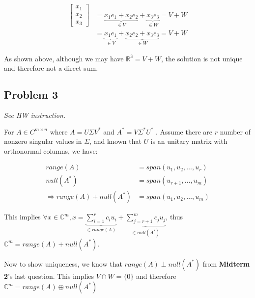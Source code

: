 \documentclass[11pt]{article}
\providecommand{\qbm}[1]{\begin{bmatrix} #1 \end{bmatrix}}
\begin{document}
\begin{align*}
    \qbm{x_1\\ x_2\\ x_3} &= \underbrace{x_1 e_1 + x_2 e_2}_{\in V} + \underbrace{x_3 e_3}_{\in W} = V + W \\
    &= \underbrace{x_1 e_1}_{\in V} + \underbrace{x_2 e_2 + x_3 e_3}_{\in W} = V + W
\end{align*}

As shown above, although we may have $\mathbb{R}^3 = V + W$, the solution is not unique and therefore not a direct sum.


\subsection*{Problem 3}
\textit{See HW instruction.}\newline

For $A \in C^{m \times n}$ where $A = U \Sigma V^*$ and $A^* = V \Sigma^* U^*$ . Assume there are $r$ number of nonzero singular values in $\Sigma$, and known that $U$ is an unitary matrix with orthonormal columns, we have:

\begin{align*}
    range(A) &= span(u_1, u_2, \dots, u_r) \\
    null(A^*) &= span(u_{r+1}, \dots, u_m) \\
    \Longrightarrow range(A) + null(A^*) &= span(u_1, u_2, \dots, u_m)
\end{align*}

This implies $\forall x \in \mathbb{C}^m, x = \underbrace{\sum\limits_{i=1}^r c_i u_i}_{\in range(A)} + \underbrace{\sum\limits_{j = r+1}^m  c_j u_j}_{\in null(A^*)}$, thus $\mathbb{C}^m = range(A) + null(A^*)$.

Now to show uniqueness, we know that $range(A) \perp null(A^*)$ from \textbf{Midterm 2}'s last question. This implies $V \cap W = \{0 \}$ and therefore $\mathbb{C}^m = range(A) \oplus null(A^*)$
\end{document}
